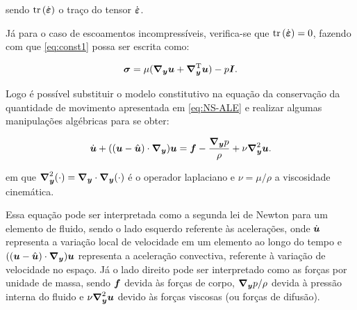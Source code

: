 \noindent sendo $\mathop{\mathrm{tr}}\nolimits{(\dot{\boldsymbol{\varepsilon}})}$ o traço do tensor $\dot{\boldsymbol{\varepsilon}}$.

Já para o caso de escoamentos incompressíveis, verifica-se que $\mathop{\mathrm{tr}}\nolimits{(\dot{\boldsymbol{\varepsilon}})}=0$, fazendo com que \eqref{eq:const1} possa ser escrita como:

\begin{equation}
    \boldsymbol{\sigma}=\mu(\boldsymbol{\nabla_y}\boldsymbol{u}+\boldsymbol{\nabla}^{\mathrm{T}}_{\boldsymbol{y}}\boldsymbol{u})-p\boldsymbol{I}\text{.}\label{eq:ModConst}
\end{equation}

Logo é possível substituir o modelo constitutivo na equação da conservação da quantidade de movimento apresentada em \eqref{eq:NS-ALE} e realizar algumas manipulações algébricas para se obter:

\begin{equation}
    \dot{\boldsymbol{u}}+((\boldsymbol{u}-\hat{\boldsymbol{u}})\cdot\boldsymbol{\nabla_y})\boldsymbol{u}=\boldsymbol{f}-\frac{\boldsymbol{\nabla_y} p}{\rho}+\nu\boldsymbol{\nabla}^2_{\boldsymbol{y}}\boldsymbol{u}\text{.}
    \label{eq:NS-ALE-2}
\end{equation}

\noindent em que $\boldsymbol{\nabla}^2_{\boldsymbol{y}}(\cdot)=\boldsymbol{\nabla_y}\cdot\boldsymbol{\nabla_y}(\cdot)$ é o operador laplaciano e $\nu=\mu/\rho$ a viscosidade cinemática.

Essa equação pode ser interpretada como a segunda lei de Newton para um elemento de fluido, sendo o lado esquerdo referente às acelerações, onde $\dot{\boldsymbol{u}}$ representa a variação local de velocidade em um elemento ao longo do tempo e $((\boldsymbol{u}-\hat{\boldsymbol{u}})\cdot\boldsymbol{\nabla_y})\boldsymbol{u}$ representa a aceleração convectiva, referente à variação de velocidade no espaço. Já o lado direito pode ser interpretado como as forças por unidade de massa, sendo $\boldsymbol{f}$ devida às forças de corpo, $\boldsymbol{\nabla_y} p/\rho$ devida à pressão interna do fluido e $\nu\boldsymbol{\nabla}^2_{\boldsymbol{y}}\boldsymbol{u}$ devido às forças viscosas (ou forças de difusão).

